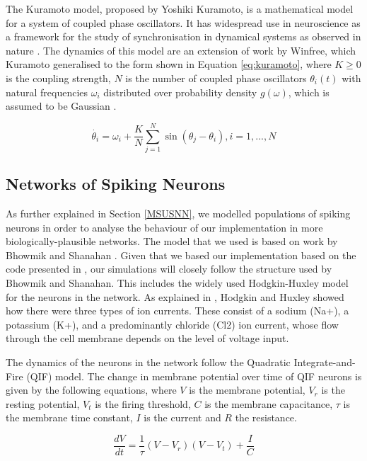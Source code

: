 \documentclass[a4paper,11pt]{article}
\begin{document}
The Kuramoto model, proposed by Yoshiki Kuramoto, is a mathematical model for a system of coupled phase oscillators. It has widespread use in neuroscience as a framework for the study of synchronisation in dynamical systems as observed in nature \cite{Cumin2007}. The dynamics of this model are an extension of work by Winfree, which Kuramoto generalised to the form shown in Equation \ref{eq:kuramoto}, where $K \geq 0$ is the coupling strength, $N$ is the number of coupled phase oscillators $\theta_{i}(t)$ with natural frequencies $\omega_{i}$ distributed over probability density $g(\omega)$, which is assumed to be Gaussian \cite{Strogatz2000}.

\begin{equation} \label{eq:kuramoto}
\dot{\theta_i} = \omega_i + \frac{K}{N} \sum_{j=1}^{N} \sin(\theta_j - \theta_i), i = 1, ..., N
\end{equation}

\subsection{Networks of Spiking Neurons}
\label{sec:bg:snn}
As further explained in Section \ref{MSUSNN}, we modelled populations of spiking neurons in order to analyse the behaviour of our implementation in more biologically-plausible networks. The model that we used is based on work by Bhowmik and Shanahan \cite{Bhowmik2013}. Given that we based our implementation based on the code presented in \cite{Bhowmik2013}, our simulations will closely follow the structure used by Bhowmik and Shanahan. This includes the widely used Hodgkin-Huxley model \cite{Hodgkin1952} for the neurons in the network. As explained in \cite{Bhowmik2013}, Hodgkin and Huxley showed how there were three types of ion currents. These consist of a sodium (Na+), a potassium (K+), and a predominantly chloride (Cl2) ion current, whose flow through the cell membrane depends on the level of voltage input.

The dynamics of the neurons in the network follow the Quadratic Integrate-and-Fire (QIF) model. The change in membrane potential over time of QIF neurons is given by the following equations, where $V$ is the membrane potential, $V_r$ is the resting potential, $V_t$ is the firing threshold, $C$ is the membrane capacitance, $\tau$ is the membrane time  constant, $I$ is the current and $R$ the resistance.

\begin{equation} \label{eq:qif}
\frac{dV}{dt} = \frac{1}{\tau}(V - V_ r)(V-V_t) +  \frac{I}{C}
\end{equation}
\end{document}
